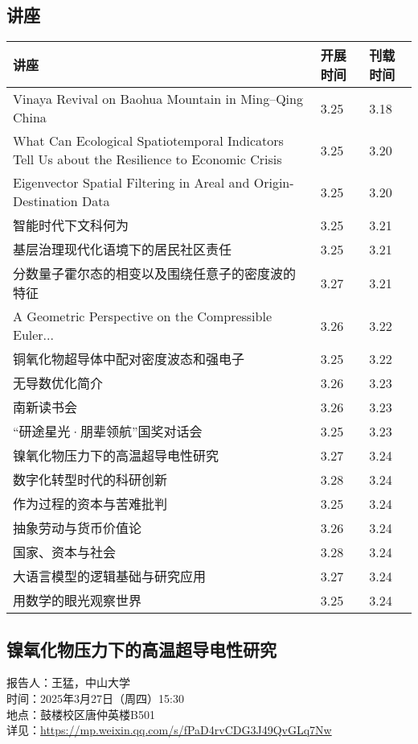 \documentclass[letterpaper, 12pt]{article}
\begin{document}
\begin{multicols}{2}
\pagebreak

\section{讲座}
\begin{tabular}{|>{\centering\arraybackslash}m{}|m{}|m{}|}
    \hline
    讲座 & 开展时间 & 刊载时间\\
    \hline\hline
    Vinaya Revival on Baohua Mountain in Ming–Qing China & 3.25 & 3.18 \\\hline
    What Can Ecological Spatiotemporal Indicators Tell Us about the Resilience to Economic Crisis & 3.25 & 3.20\\\hline
    Eigenvector Spatial Filtering in Areal and Origin-Destination Data & 3.25 & 3.20\\\hline
    智能时代下文科何为 & 3.25 & 3.21\\\hline
    基层治理现代化语境下的居民社区责任 & 3.25 & 3.21\\\hline
    分数量子霍尔态的相变以及围绕任意子的密度波的特征 & 3.27 & 3.21\\\hline
    A Geometric Perspective on the Compressible Euler... & 3.26 & 3.22\\\hline
    铜氧化物超导体中配对密度波态和强电子 & 3.25 & 3.22\\\hline
    无导数优化简介 & 3.26 & 3.23\\\hline
    南新读书会 & 3.26 & 3.23\\\hline
    “研途星光·朋辈领航”国奖对话会 & 3.25 & 3.23\\\hline
    镍氧化物压力下的高温超导电性研究 & 3.27 & 3.24\\\hline
    数字化转型时代的科研创新 & 3.28 & 3.24\\\hline
    作为过程的资本与苦难批判 & 3.25 & 3.24\\\hline
    抽象劳动与货币价值论 & 3.26 & 3.24\\\hline
    国家、资本与社会 & 3.28 & 3.24\\\hline
    大语言模型的逻辑基础与研究应用 & 3.27 & 3.24\\\hline
    用数学的眼光观察世界 & 3.25 & 3.24\\\hline
\end{tabular}
\subsection{镍氧化物压力下的高温超导电性研究}
报告人：王猛，中山大学
\\时间：2025年3月27日（周四）15:30
\\地点：鼓楼校区唐仲英楼B501
\\详见：\url{https://mp.weixin.qq.com/s/fPaD4rvCDG3J49QvGLq7Nw}


\end{multicols}
\end{document}
